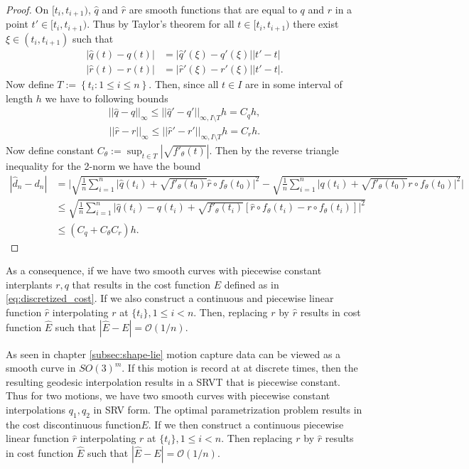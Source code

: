 \begin{proof}
  On  \([t_i, t_{i+1})\),  \(\hat q\) and  \(\hat r\) are smooth functions that are equal to  \(q\) and  \(r\) in a point  \(t' \in [t_i, t_{i+1})\). Thus by Taylor's theorem for all  \(t \in [t_i, t_{i+1})\) there exist  \(\xi \in (t_i, t_{i+1})\) such that
  \begin{align*}
    |\hat q(t) - q(t)| & = |\hat q'(\xi) - q'(\xi)||t' - t|  \\
    |\hat r(t) - r(t)| & = |\hat r'(\xi) - r'(\xi)||t' - t|.
  \end{align*}
  Now define  \(T:= \left \{t_i : 1 \leq i \leq n \right \} \). Then, since all  \(t \in I\) are in some interval of length  \(h\) we have to following bounds
  \begin{align*}
    ||\hat q - q||_{\infty} \leq ||\hat q' - q'||_{\infty, I \setminus T}h = C_q h,
  \end{align*}
  \begin{align*}
    ||\hat r - r||_{\infty} \leq ||\hat r' - r'||_{\infty, I \setminus T}h = C_r h.
  \end{align*}
  Now define constant  \(C_{\theta}:= \sup_{t\in T} | \sqrt{f'_\theta(t)} | \). Then by the reverse triangle inequality for the 2-norm we have the bound
  \begin{align*}
    |\hat d_n - d_n |
     & = \Bigg| \sqrt{\frac{1}{n}\sum_{i=1}^{n}\Big|\hat q(t_i) + \sqrt{f'_{\theta}(t_0)} \hat r \circ f_{\theta}(t_0)\Big|^2}-\sqrt{\frac{1}{n}\sum_{i=1}^{n}\Big|q(t_i) + \sqrt{f'_{\theta}(t_0)} r \circ f_{\theta}(t_0)\Big|^2 } \Bigg| \\
     & \leq \sqrt{\frac{1}{n}\sum_{i=1}^{n}\Big|\hat q(t_i) - q(t_i)  + \sqrt{f'_{\theta}(t_i)}\left[  \hat r \circ f_{\theta}(t_i) - r \circ f_{\theta}(t_i)\right]\Big|^2}                                                                \\
     & \leq \left(C_q  + C_{\theta} C_r \right)h.
  \end{align*}
\end{proof}

As a consequence, if we have two smooth curves with piecewise constant interplants \(r, q\) that results in the cost function \(E\) defined as in \eqref{eq:discretized_cost}. If we also construct a continuous and piecewise linear function \(\hat r\) interpolating \(r\) at \(\{t_i\}, 1 \leq i <n\). Then, replacing \(r\) by \(\hat r\) results in cost function  \(\hat{E}\) such that \(|\hat{E} - E |= \mathcal{O}(1/n)\).


As seen in chapter \ref{subsec:shape-lie} motion capture data can be viewed as a smooth curve in \({SO(3)}^m\). If this motion is record at at discrete times, then the resulting geodesic interpolation results in a SRVT that is piecewise constant. Thus for two motions, we have two smooth curves with piecewise constant interpolations \(q_1, q_2\) in SRV form. The optimal parametrization problem results in the cost discontinuous function\(E\). If we then construct a continuous piecewise linear function \(\hat r\) interpolating \(r\) at \(\{t_i\}, 1 \leq i <n\). Then replacing \(r\) by \(\hat r\) results in cost function  \(\hat{E}\) such that \(|\hat{E} - E |= \mathcal{O}(1/n)\).
